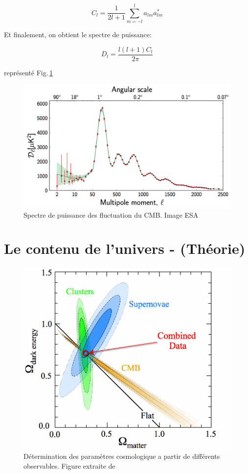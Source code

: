 \begin{equation}
C_l = \frac{1}{2l+1} \sum_{m=-l}^l a_{lm} a_{lm}^*
\end{equation}


Et finalement, on obtient le spectre de puissance:

\begin{equation}
D_l = \frac{l (l+1) C_l }{2 \pi} 
\end{equation}

représenté Fig.\,\ref{fig:cmb_power_spectrum}

\begin{figure}[bth]
        \includegraphics[width=.95\linewidth]{img/01/CMB_power_spectrum.png} 
        \caption{Spectre de puissance des fluctuation du CMB.
        Image ESA}
 		\label{fig:cmb_power_spectrum}
\end{figure}


\section{Le contenu de l'univers - (Théorie)}


\begin{figure}[bth]
        \includegraphics[width=.95\linewidth]{img/01/cosmoparam.png} 
        \caption{Détermination des paramètres cosmologique a partir de différents observables. Figure extraite de \cite{2008ApJ...686..749K}}
 		\label{fig:cosmoparam}
\end{figure}

